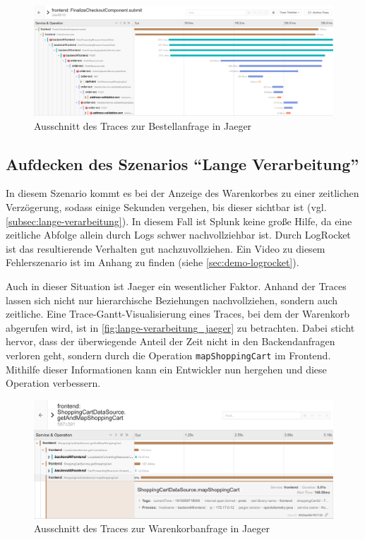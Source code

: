 \begin{figure}[H]
	\centering
	\includegraphics[width=1.00\linewidth]{img/05_ergebnis/ungueltige-adressen-sind-gueltig_jaeger-detail.png}
	\caption{Ausschnitt des Traces zur Bestellanfrage in Jaeger}
	\label{fig:ungueltige-adressen-sind-gueltig_jaeger-detail}
\end{figure}

\subsection{Aufdecken des Szenarios \enquote{Lange Verarbeitung}}

In diesem Szenario kommt es bei der Anzeige des Warenkorbes zu einer zeitlichen Verzögerung, sodass einige Sekunden vergehen, bis dieser sichtbar ist (vgl. \autoref{subsec:lange-verarbeitung}). In diesem Fall ist Splunk keine große Hilfe, da eine zeitliche Abfolge allein durch Logs schwer nachvollziehbar ist. Durch LogRocket ist das resultierende Verhalten gut nachzuvollziehen. Ein Video zu diesem Fehlerszenario ist im Anhang zu finden (siehe \autoref{sec:demo-logrocket}).

Auch in dieser Situation ist Jaeger ein wesentlicher Faktor. Anhand der Traces lassen sich nicht nur hierarchische Beziehungen nachvollziehen, sondern auch zeitliche. Eine Trace-Gantt-Visualisierung eines Traces, bei dem der Warenkorb abgerufen wird, ist in \autoref{fig:lange-verarbeitung_jaeger} zu betrachten. Dabei sticht hervor, dass der überwiegende Anteil der Zeit nicht in den Backendanfragen verloren geht, sondern durch die Operation \texttt{mapShoppingCart} im Frontend. Mithilfe dieser Informationen kann ein Entwickler nun hergehen und diese Operation verbessern.

\begin{figure}[H]
	\centering
	\includegraphics[width=1.00\linewidth]{img/05_ergebnis/lange-verarbeitung_jaeger.png}
	\caption{Ausschnitt des Traces zur Warenkorbanfrage in Jaeger}
	\label{fig:lange-verarbeitung_jaeger}
\end{figure}